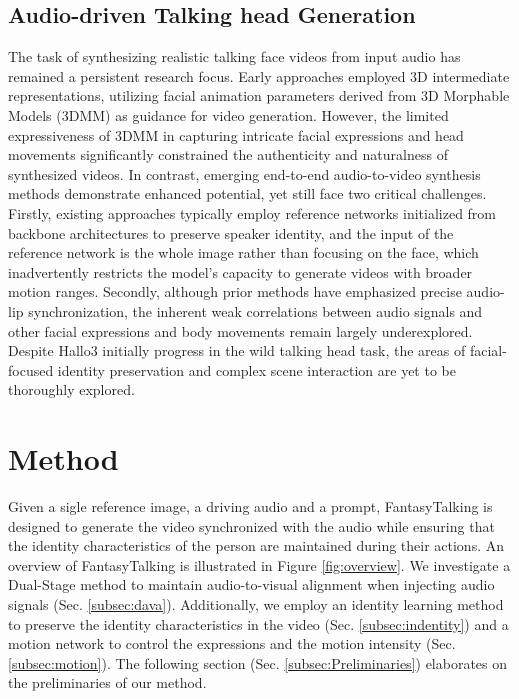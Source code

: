\documentclass[sigconf]{acmart}
\begin{document}
\subsection{Audio-driven Talking head Generation}
The task of synthesizing realistic talking face videos from input audio has remained a persistent research focus. Early approaches \cite{zhang2023sadtalker, ma2023dreamtalk, wei2024aniportrait} employed 3D intermediate representations, utilizing facial animation parameters derived from 3D Morphable Models (3DMM)  as guidance for video generation. However, the limited expressiveness of 3DMM in capturing intricate facial expressions and head movements significantly constrained the authenticity and naturalness of synthesized videos. In contrast, emerging end-to-end audio-to-video synthesis methods \cite{tian2024emo, jiang2024loopy, chen2024echomimic, cui2024hallo3} demonstrate enhanced potential, yet still face two critical challenges. Firstly, existing approaches typically employ reference networks initialized from backbone architectures to preserve speaker identity, and the input of the reference network is the whole image rather than focusing on the face, which inadvertently restricts the model's capacity to generate videos with broader motion ranges. Secondly, although prior methods have emphasized precise audio-lip synchronization, the inherent weak correlations between audio signals and other facial expressions and body movements remain largely underexplored. Despite Hallo3 initially progress in the wild talking head task, the areas of facial-focused identity preservation and complex scene interaction are yet to be thoroughly explored.

\section{Method}

Given a sigle reference image, a driving audio and a prompt, FantasyTalking is designed to generate the video synchronized with the audio while ensuring that the identity characteristics of the person are maintained during their actions. An overview of FantasyTalking is illustrated in Figure \ref{fig:overview}. We investigate a Dual-Stage method to maintain audio-to-visual alignment when injecting audio signals (Sec. \ref{subsec:dava}). Additionally, we employ an identity learning method to preserve the identity characteristics in the video (Sec. \ref{subsec:indentity}) and a motion network to control the expressions and the motion intensity (Sec. \ref{subsec:motion}). The following section (Sec. \ref{subsec:Preliminaries}) elaborates on the preliminaries of our method. 
\end{document}
